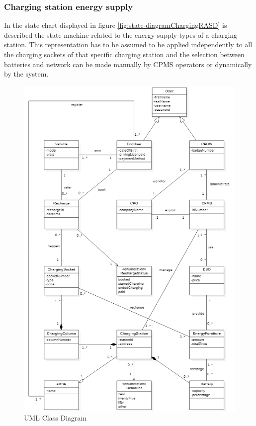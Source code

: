 \documentclass[a4paper]{report}
\begin{document}
\subsubsection{Charging station energy supply}
In the state chart displayed in figure \ref{fig:state-diagramChargingRASD} is described the state machine related to the energy supply types of a charging station. This representation has to be assumed to be applied independently to all the charging sockets of that specific charging station and the selection between batteries and network can be made manually by CPMS operators or dynamically by the system.

\begin{figure}[p]
\includegraphics[width=\textwidth]{classDiagramRASDUpdated.png}
\caption{UML Class Diagram}
\label{fig:class-diagramRASD}
\end{figure}
\restoregeometry
\end{document}
